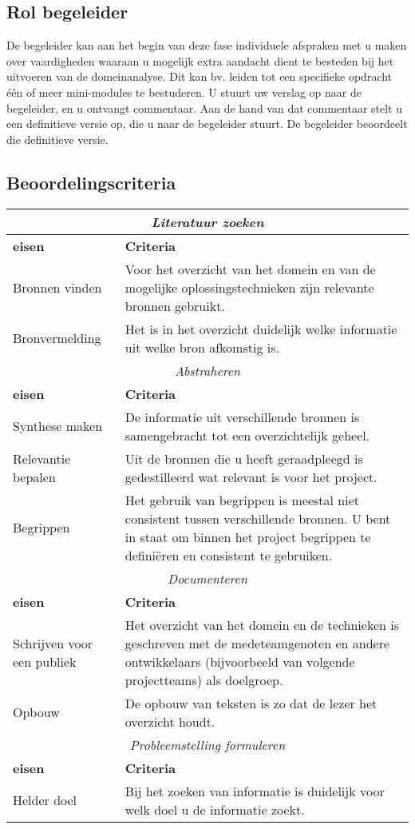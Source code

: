 \subsection{Rol begeleider}
De begeleider kan aan het begin van deze fase individuele afspraken met u maken
over vaardigheden waaraan u mogelijk extra aandacht dient te besteden bij het
uitvoeren van de domeinanalyse. Dit kan bv. leiden tot een specifieke opdracht
één of meer mini-modules te bestuderen.
U stuurt uw verslag op naar de begeleider, en u ontvangt commentaar.
Aan de hand van dat commentaar stelt u een definitieve versie op, die u naar de
begeleider stuurt. De begeleider beoordeelt die definitieve versie.

\subsection{Beoordelingscriteria}
\vspace{1em}
\par{\tiny
\begin{center}
\begin{tabular}{|l|p{30em}|}
\hline
\multicolumn{2}{|c|}{\emph{Literatuur zoeken}}\\\hline
{\bf eisen} & {\bf Criteria}\\\hline
Bronnen vinden & Voor het overzicht van het domein en van de mogelijke oplossingstechnieken zijn
		    relevante bronnen gebruikt.
\\\hline
Bronvermelding & Het is in het overzicht duidelijk welke informatie uit welke bron afkomstig is.
\\\hline
\multicolumn{2}{|c|}{\emph{Abstraheren}}\\\hline
{\bf eisen} & {\bf Criteria}\\\hline
Synthese maken & De informatie uit verschillende bronnen is samengebracht tot
		een overzichtelijk geheel.
\\\hline
Relevantie bepalen & Uit de bronnen die u heeft geraadpleegd is gedestilleerd wat relevant is voor
		    het project.
\\\hline
Begrippen & Het gebruik van begrippen is meestal niet consistent tussen verschillende
bronnen. U bent in staat om binnen het project begrippen te definiëren en
consistent te gebruiken.
\\\hline
\multicolumn{2}{|c|}{\emph{Documenteren}}\\\hline
{\bf eisen} & {\bf Criteria}\\\hline
Schrijven voor een publiek & Het overzicht van het domein en de technieken is geschreven met de
		medeteamgenoten en andere ontwikkelaars (bijvoorbeeld van volgende projectteams)
		als doelgroep.
\\\hline
Opbouw & De opbouw van teksten is zo dat de lezer het overzicht houdt.
\\\hline
\multicolumn{2}{|c|}{\emph{Probleemstelling formuleren}}\\\hline
{\bf eisen} & {\bf Criteria}\\\hline
Helder doel & Bij het zoeken van informatie is duidelijk voor welk doel u de informatie zoekt.
\\\hline
\end{tabular}
\end{center}
}%